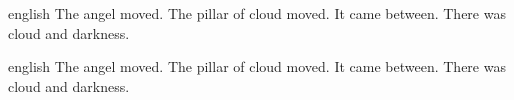 \documentclass{article}
\begin{document}
\begin{mekor}
\begin{mekorlang}{english}
\pasuk[14:19]  The angel moved.  The pillar of cloud moved. \pasuk {} It came between.  There was cloud and darkness.
\end{mekorlang}
\end{mekor}
\begin{mekor}
\begin{mekorlang}{english}
\pasuk[14:19]  The angel moved.  The pillar of cloud moved. \pasuk {} It came between.  There was cloud and darkness.
\end{mekorlang}
\end{mekor}
\end{document}
